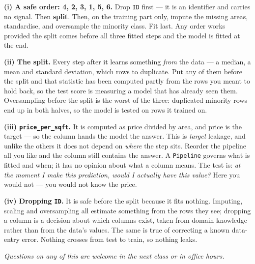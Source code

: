 \documentclass[10pt,a4paper]{article}
\begin{document}
\textbf{(i) A safe order: 4, 2, 3, 1, 5, 6.} Drop \texttt{ID} first --- it is an identifier and carries no signal. Then \textbf{split}. Then, on the training part only, impute the missing areas, standardise, and oversample the minority class. Fit last. Any order works provided the split comes before all three fitted steps and the model is fitted at the end.\par\vspace{1mm}\textbf{(ii) The split.} Every step after it learns something \emph{from} the data --- a median, a mean and standard deviation, which rows to duplicate. Put any of them before the split and that statistic has been computed partly from the rows you meant to hold back, so the test score is measuring a model that has already seen them. Oversampling before the split is the worst of the three: duplicated minority rows end up in both halves, so the model is tested on rows it trained on.\par\vspace{1mm}\textbf{(iii) \texttt{price\_per\_sqft}.} It is computed as price divided by area, and price is the target --- so the column hands the model the answer. This is \emph{target} leakage, and unlike the others it does not depend on \emph{where} the step sits. Reorder the pipeline all you like and the column still contains the answer. A \texttt{Pipeline} governs what is fitted and when; it has no opinion about what a column means. The test is: \emph{at the moment I make this prediction, would I actually have this value?} Here you would not --- you would not know the price.\par\vspace{1mm}\textbf{(iv) Dropping \texttt{ID}.} It is safe before the split because it fits nothing. Imputing, scaling and oversampling all estimate something from the rows they see; dropping a column is a decision about which columns exist, taken from domain knowledge rather than from the data's values. The same is true of correcting a known data-entry error. Nothing crosses from test to train, so nothing leaks.

\vfill

{\footnotesize\itshape Questions on any of this are welcome in the next class or in office hours.}

\newpage
\end{document}
